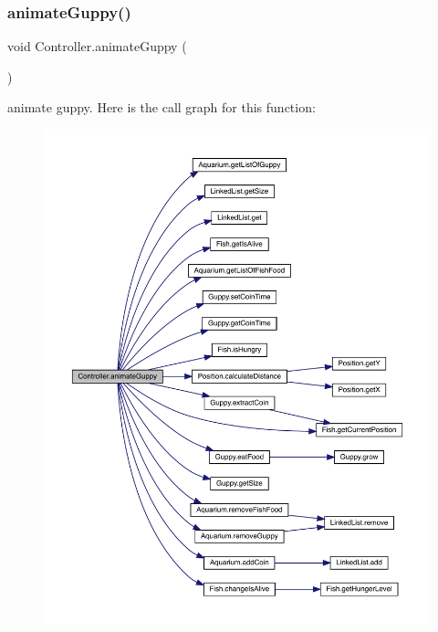 \subsubsection{\texorpdfstring{animate\+Guppy()}{animateGuppy()}}
{\footnotesize\ttfamily void Controller.\+animate\+Guppy (\begin{DoxyParamCaption}{ }\end{DoxyParamCaption})\hspace{0.3cm}{\ttfamily [inline]}}

animate guppy. Here is the call graph for this function\+:
\nopagebreak
\begin{figure}[H]
\begin{center}
\leavevmode
\includegraphics[width=350pt]{class_controller_ac950a5d811e4f3d266e8952e0140faa0_cgraph}
\end{center}
\end{figure}
\mbox{\label{class_controller_a4a6a2af6faf89e4bc96bac2dc8b190f4}} 
